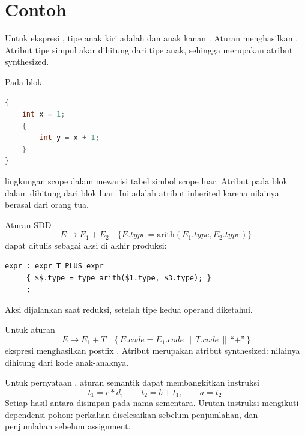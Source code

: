 \section*{Contoh}

\begin{contoh}
Untuk ekspresi , tipe anak kiri adalah  dan
anak kanan . Aturan 
menghasilkan . Atribut tipe simpul akar dihitung dari
tipe anak, sehingga merupakan atribut synthesized.
\end{contoh}

\begin{contoh}
Pada blok
\begin{lstlisting}[language=C]
{
    int x = 1;
    {
        int y = x + 1;
    }
}
\end{lstlisting}
lingkungan scope dalam mewarisi tabel simbol scope luar. Atribut
 pada blok dalam dihitung dari blok luar. Ini adalah
atribut inherited karena nilainya berasal dari orang tua.
\end{contoh}

\begin{contoh}
Aturan SDD
\[
E \to E_1 + E_2 \quad \{ E.type = \text{arith}(E_1.type,
E_2.type) \}
\]
dapat ditulis sebagai aksi di akhir produksi:
\begin{lstlisting}[language=Bison]
expr : expr T_PLUS expr
     { $$.type = type_arith($1.type, $3.type); }
     ;
\end{lstlisting}
Aksi dijalankan saat reduksi, setelah tipe kedua operand diketahui.
\end{contoh}

\begin{contoh}
Untuk aturan
\[
E \to E_1 + T \quad \{\, E.code = E_1.code \,\|\, T.code \,\|\,
\text{``+''} \,\}
\]
ekspresi  menghasilkan postfix
. Atribut  merupakan atribut synthesized:
nilainya dihitung dari kode anak-anaknya.
\end{contoh}

\begin{contoh}
Untuk pernyataan , aturan semantik dapat
membangkitkan instruksi
\[
t_1 = c * d, \qquad t_2 = b + t_1, \qquad a = t_2.
\]
Setiap hasil antara disimpan pada nama sementara. Urutan instruksi
mengikuti dependensi pohon: perkalian diselesaikan sebelum
penjumlahan, dan penjumlahan sebelum assignment.
\end{contoh}

